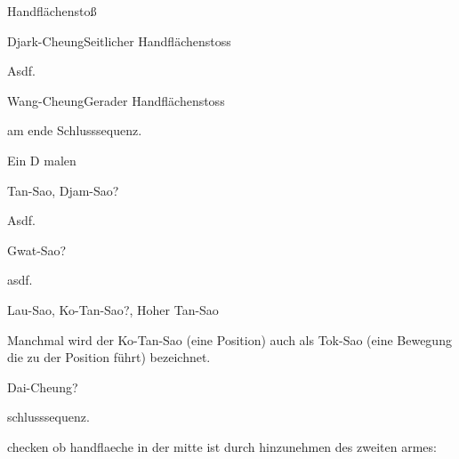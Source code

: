 
\begin{WTSatz}{Handfl\"achensto{\ss}}%
	\begin{WTSatzTeil}{Djark-Cheung}{Seitlicher Handfl\"achenstoss}

		Asdf.
	\end{WTSatzTeil}
	\begin{WTSatzTeil}{Wang-Cheung}{Gerader Handfl\"achenstoss}

		am ende Schlusssequenz.
	\end{WTSatzTeil}
\end{WTSatz}



\begin{WTSatz}{Ein D malen}%
	\begin{WTSatzTeil}{Tan-Sao, Djam-Sao}{?}
		
		Asdf.
	\end{WTSatzTeil}
	\begin{WTSatzTeil}{Gwat-Sao}{?}
		
		asdf.
	\end{WTSatzTeil}
	\begin{WTSatzTeil}{Lau-Sao, Ko-Tan-Sao}{?, Hoher Tan-Sao}
		
		Manchmal wird der Ko-Tan-Sao (eine Position) auch als Tok-Sao (eine Bewegung die zu der Position f\"uhrt) bezeichnet.
	\end{WTSatzTeil}
	\begin{WTSatzTeil}{Dai-Cheung}{?}
		
		schlusssequenz.
		
		checken ob handflaeche in der mitte ist durch hinzunehmen des zweiten armes:
	\end{WTSatzTeil}
\end{WTSatz}


